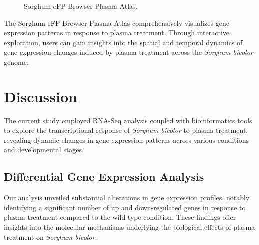 \documentclass[12pt,letterpaper]{article}
\begin{document}
\begin{figure}[H]
    \centering
    \caption{Sorghum eFP Browser Plasma Atlas.}
    \label{fig:enter-label}
\end{figure}

The Sorghum eFP Browser Plasma Atlas comprehensively visualizes gene expression patterns in response to plasma treatment. Through interactive exploration, users can gain insights into the spatial and temporal dynamics of gene expression changes induced by plasma treatment across the \textit{Sorghum bicolor} genome.

\section{Discussion}

The current study employed RNA-Seq analysis coupled with bioinformatics tools to explore the transcriptional response of \textit{Sorghum bicolor} to plasma treatment, revealing dynamic changes in gene expression patterns across various conditions and developmental stages.

\subsection{Differential Gene Expression Analysis}

Our analysis unveiled substantial alterations in gene expression profiles, notably identifying a significant number of up and down-regulated genes in response to plasma treatment compared to the wild-type condition. These findings offer insights into the molecular mechanisms underlying the biological effects of plasma treatment on \textit{Sorghum bicolor}.
\end{document}

